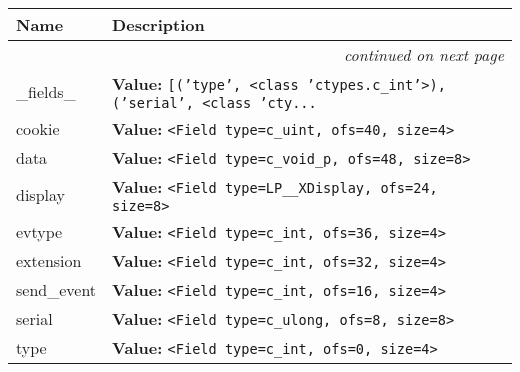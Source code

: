     \vspace{-1cm}
\hspace{\varindent}\begin{longtable}{|p{\varnamewidth}|p{\vardescrwidth}|l}
\cline{1-2}
\cline{1-2} \centering \textbf{Name} & \centering \textbf{Description}& \\
\cline{1-2}
\endhead\cline{1-2}\multicolumn{3}{r}{\small\textit{continued on next page}}\\\endfoot\cline{1-2}
\endlastfoot\raggedright \_\-f\-i\-e\-l\-d\-s\-\_\- & \raggedright \textbf{Value:} 
{\tt \texttt{[}\texttt{(}\texttt{'}\texttt{type}\texttt{'}\texttt{, }{\textless}class 'ctypes.c\_int'{\textgreater}\texttt{)}\texttt{, }\texttt{(}\texttt{'}\texttt{serial}\texttt{'}\texttt{, }{\textless}class 'cty\texttt{...}}&\\
\cline{1-2}
\raggedright c\-o\-o\-k\-i\-e\- & \raggedright \textbf{Value:} 
{\tt {\textless}Field type=c\_uint, ofs=40, size=4{\textgreater}}&\\
\cline{1-2}
\raggedright d\-a\-t\-a\- & \raggedright \textbf{Value:} 
{\tt {\textless}Field type=c\_void\_p, ofs=48, size=8{\textgreater}}&\\
\cline{1-2}
\raggedright d\-i\-s\-p\-l\-a\-y\- & \raggedright \textbf{Value:} 
{\tt {\textless}Field type=LP\_\_XDisplay, ofs=24, size=8{\textgreater}}&\\
\cline{1-2}
\raggedright e\-v\-t\-y\-p\-e\- & \raggedright \textbf{Value:} 
{\tt {\textless}Field type=c\_int, ofs=36, size=4{\textgreater}}&\\
\cline{1-2}
\raggedright e\-x\-t\-e\-n\-s\-i\-o\-n\- & \raggedright \textbf{Value:} 
{\tt {\textless}Field type=c\_int, ofs=32, size=4{\textgreater}}&\\
\cline{1-2}
\raggedright s\-e\-n\-d\-\_\-e\-v\-e\-n\-t\- & \raggedright \textbf{Value:} 
{\tt {\textless}Field type=c\_int, ofs=16, size=4{\textgreater}}&\\
\cline{1-2}
\raggedright s\-e\-r\-i\-a\-l\- & \raggedright \textbf{Value:} 
{\tt {\textless}Field type=c\_ulong, ofs=8, size=8{\textgreater}}&\\
\cline{1-2}
\raggedright t\-y\-p\-e\- & \raggedright \textbf{Value:} 
{\tt {\textless}Field type=c\_int, ofs=0, size=4{\textgreater}}&\\
\cline{1-2}
\end{longtable}


